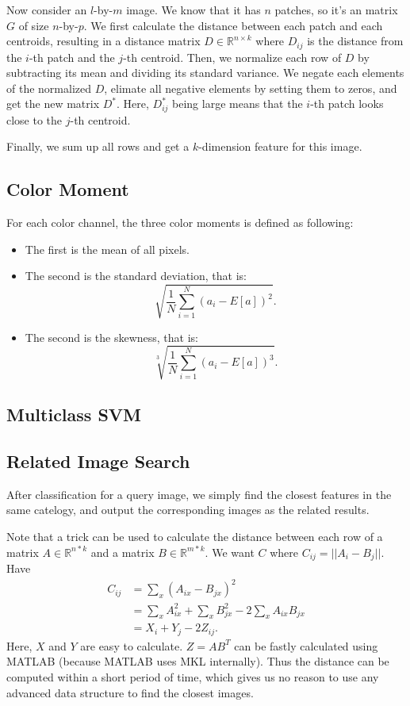 \documentclass{acm_proc_article-sp}
\begin{document}
Now consider an $l$-by-$m$ image.
We know that it has $n$ patches, so it's an matrix $G$ of size $n$-by-$p$.
We first calculate the distance between each patch
and each centroids, resulting in a distance matrix $D\in\mathbb{R}^{n\times k}$
where $D_{ij}$ is the distance from the $i$-th patch
and the $j$-th centroid.
Then, we normalize each row of $D$ by
    subtracting its mean and dividing its standard variance.
We negate each elements of the normalized $D$, elimate
    all negative elements by setting them to zeros,
    and get the new matrix $D^*$.
Here, $D^*_{ij}$ being large means that the $i$-th patch
    looks close to the $j$-th centroid.

Finally, we sum up all rows and get a $k$-dimension feature for this image.

\subsection{Color Moment}

For each color channel, the three color moments is defined as following:
\begin{itemize}
    \item The first is the mean of all pixels.
    \item The second is the standard deviation, that is:
        \[
            \sqrt{\frac{1}{N} \sum_{i=1}^N {(a_i-E[a])}^2}.
        \]
    \item The second is the skewness, that is:
        \[
            \sqrt[3]{\frac{1}{N} \sum_{i=1}^N {(a_i-E[a])}^3}.
        \]
\end{itemize}

\subsection{Multiclass SVM}

\subsection{Related Image Search}

After classification for a query image,
    we simply find the closest features in the same catelogy,
    and output the corresponding images as the related results.

Note that a trick can be used to calculate the distance
between each row of a matrix $A\in\mathbb{R}^{n*k}$ 
and a matrix $B\in\mathbb{R}^{m*k}$.
We want $C$ where $C_{ij}=||A_i - B_j||$. Have
\begin{align*}
    C_{ij} &= \sum_x {(A_{ix} - B_{jx})}^2 \\
           &= \sum_x A_{ix}^2 + \sum_x B_{jx}^2 - 2 \sum_x A_{ix} B_{jx} \\
           &= X_i + Y_j - 2 Z_{ij}.
\end{align*}
Here, $X$ and $Y$ are easy to calculate.
$Z=AB^T$ can be fastly calculated using MATLAB (because MATLAB uses MKL
internally).
Thus the distance can be computed within a short period of time,
    which gives us no reason to
    use any advanced data structure
    to find the closest images.
\end{document}
